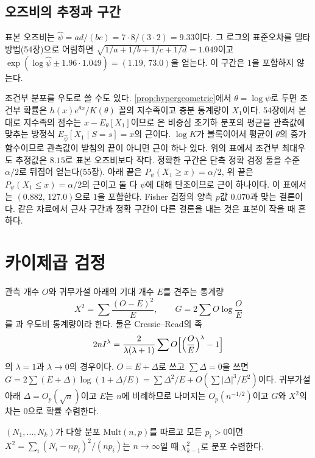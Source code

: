\subsection{오즈비의 추정과 구간}

표본 오즈비는 $\hat\psi=ad/(bc)=7\cdot8/(3\cdot2)=9.33$이다. 그 로그의 표준오차를 델타 방법(54장)으로 어림하면 $\sqrt{1/a+1/b+1/c+1/d}=1.049$이고  $\exp(\log\hat\psi\pm1.96\cdot1.049)=(1.19,\,73.0)$을 얻는다\cite{woolf1955}. 이 구간은 $1$을 포함하지 않는다.

조건부 분포를 우도로 쓸 수도 있다. \cref{prop:hypergeometric}에서 $\theta=\log\psi$로 두면 조건부 확률은 $h(x)e^{\theta x}/K(\theta)$ 꼴의 지수족이고 충분 통계량이 $X_1$이다. 54장에서 본 대로 지수족의 점수는 $x-E_\theta[X_1]$이므로 은 비중심 초기하 분포의 평균을 관측값에 맞추는 방정식 $E_{\hat\psi}[X_1\mid S=s]=x$의 근이다. $\log K$가 볼록이어서 평균이 $\theta$의 증가 함수이므로 관측값이 받침의 끝이 아니면 근이 하나 있다. 위의 표에서 조건부 최대우도 추정값은 $8.15$로 표본 오즈비보다 작다. 정확한 구간은 단측 정확 검정 둘을 수준 $\alpha/2$로 뒤집어 얻는다(55장). 아래 끝은 $P_\psi(X_1\ge x)=\alpha/2$, 위 끝은 $P_\psi(X_1\le x)=\alpha/2$의 근이고 둘 다 $\psi$에 대해 단조이므로 근이 하나이다. 이 표에서는 $(0.882,\,127.0)$으로 $1$을 포함한다. Fisher 검정의 양측 $p$값 $0.070$과 맞는 결론이다. 같은 자료에서 근사 구간과 정확 구간이 다른 결론을 내는 것은 표본이 작을 때 흔하다.

\section{카이제곱 검정}
\label{sec:chi-square}

관측 개수 $O$와 귀무가설 아래의 기대 개수 $E$를 견주는 통계량
\[
X^2=\sum\frac{(O-E)^2}E,\qquad G=2\sum O\log\frac OE
\]
를 \cite{pearson1900chi}과 우도비 통계량이라 한다. 둘은 Cressie--Read의  족
\[
2nI^\lambda=\frac2{\lambda(\lambda+1)}\sum O\Bigl[\Bigl(\frac OE\Bigr)^\lambda-1\Bigr]
\]
의 $\lambda=1$과 $\lambda\to0$의 경우이다\cite{cressie1984}. $O=E+\Delta$로 쓰고 $\sum\Delta=0$을 쓰면 $G=2\sum(E+\Delta)\log(1+\Delta/E)=\sum\Delta^2/E+O(\sum|\Delta|^3/E^2)$이다. 귀무가설 아래 $\Delta=O_p(\sqrt n)$이고 $E$는 $n$에 비례하므로 나머지는 $O_p(n^{-1/2})$이고 $G$와 $X^2$의 차는 $0$으로 확률 수렴한다.

\begin{theorem}
\label{thm:pearson-gof}
$(N_1,\dots,N_k)$가 다항 분포 $\mathrm{Mult}(n,p)$를 따르고 모든 $p_i>0$이면 $X^2=\sum_i(N_i-np_i)^2/(np_i)$는 $n\to\infty$일 때 $\chi^2_{k-1}$로 분포 수렴한다.
\end{theorem}

